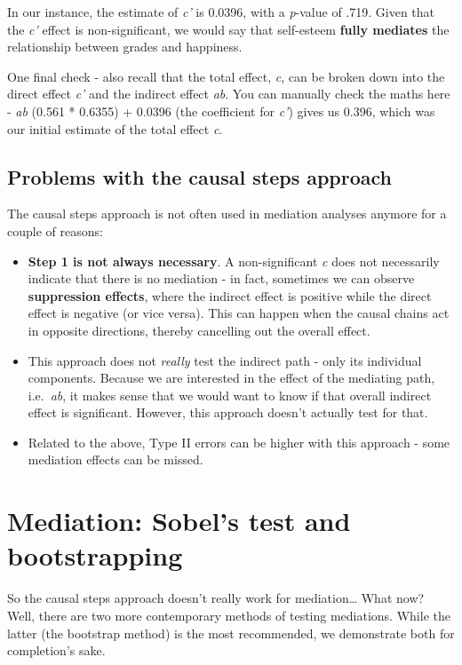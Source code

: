 \documentclass[
]{book}
\providecommand{\tightlist}{%
  \setlength{\itemsep}{0pt}\setlength{\parskip}{0pt}}
\begin{document}
In our instance, the estimate of \emph{c'} is 0.0396, with a \emph{p}-value of .719. Given that the \emph{c'} effect is non-significant, we would say that self-esteem \textbf{fully mediates} the relationship between grades and happiness.

One final check - also recall that the total effect, \emph{c}, can be broken down into the direct effect \emph{c'} and the indirect effect \emph{ab}. You can manually check the maths here - \emph{ab} (0.561 * 0.6355) + 0.0396 (the coefficient for \emph{c'}) gives us 0.396, which was our initial estimate of the total effect \emph{c}.

\subsection{Problems with the causal steps approach}\label{problems-with-the-causal-steps-approach}

The causal steps approach is not often used in mediation analyses anymore for a couple of reasons:

\begin{itemize}
\tightlist
\item
  \textbf{Step 1 is not always necessary}. A non-significant \emph{c} does not necessarily indicate that there is no mediation - in fact, sometimes we can observe \textbf{suppression effects}, where the indirect effect is positive while the direct effect is negative (or vice versa). This can happen when the causal chains act in opposite directions, thereby cancelling out the overall effect.
\item
  This approach does not \emph{really} test the indirect path - only its individual components. Because we are interested in the effect of the mediating path, i.e.~\emph{ab}, it makes sense that we would want to know if that overall indirect effect is significant. However, this approach doesn't actually test for that.
\item
  Related to the above, Type II errors can be higher with this approach - some mediation effects can be missed.
\end{itemize}

\section{Mediation: Sobel's test and bootstrapping}\label{mediation-sobels-test-and-bootstrapping}

So the causal steps approach doesn't really work for mediation\ldots{} What now? Well, there are two more contemporary methods of testing mediations. While the latter (the bootstrap method) is the most recommended, we demonstrate both for completion's sake.
\end{document}
